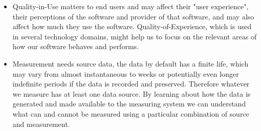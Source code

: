 \begin{itemize}
    \item Quality-in-Use matters to end users and may affect their "user experience", their perceptions of the software and provider of that software, and may also affect how much they use the software. Quality-of-Experience, which is used in several technology domains, might help us to focus on the relevant areas of how our software behaves and performs.
    \item Measurement needs source data, the data by default has a finite life, which may vary from almost instantaneous to weeks or potentially even longer indefinite periods if the data is recorded and preserved. Therefore whatever we measure has at least one data source. By learning about how the data is generated and made available to the measuring system we can understand what can and cannot be measured using a particular combination of source and measurement. 
\end{itemize}
